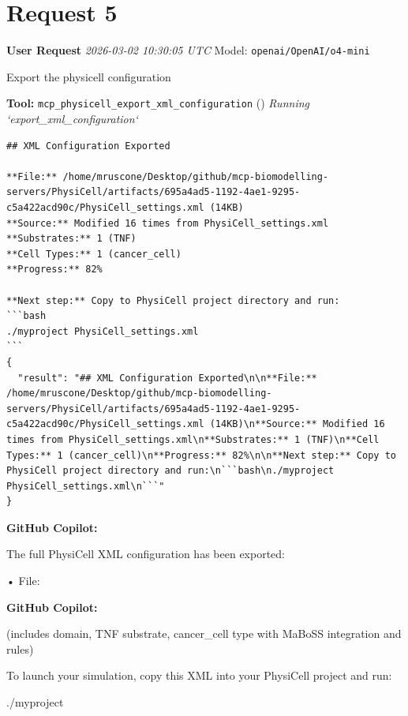 \documentclass[11pt,a4paper]{article}
\begin{document}
\section{Request 5}
\begin{userbox}
\textbf{User Request}
\quad \textit{2026-03-02 10:30:05 UTC}
\quad Model: \texttt{openai/OpenAI/o4-mini}

Export the physicell configuration

\end{userbox}
\begin{toolokbox}
\textbf{Tool:} \texttt{mcp\_physicell\_export\_xml\_configuration} (\checkmark)
\textit{Running `export\_xml\_configuration`}
\begin{lstlisting}
## XML Configuration Exported

**File:** /home/mruscone/Desktop/github/mcp-biomodelling-servers/PhysiCell/artifacts/695a4ad5-1192-4ae1-9295-c5a422acd90c/PhysiCell_settings.xml (14KB)
**Source:** Modified 16 times from PhysiCell_settings.xml
**Substrates:** 1 (TNF)
**Cell Types:** 1 (cancer_cell)
**Progress:** 82%

**Next step:** Copy to PhysiCell project directory and run:
```bash
./myproject PhysiCell_settings.xml
```
{
  "result": "## XML Configuration Exported\n\n**File:** /home/mruscone/Desktop/github/mcp-biomodelling-servers/PhysiCell/artifacts/695a4ad5-1192-4ae1-9295-c5a422acd90c/PhysiCell_settings.xml (14KB)\n**Source:** Modified 16 times from PhysiCell_settings.xml\n**Substrates:** 1 (TNF)\n**Cell Types:** 1 (cancer_cell)\n**Progress:** 82%\n\n**Next step:** Copy to PhysiCell project directory and run:\n```bash\n./myproject PhysiCell_settings.xml\n```"
}
\end{lstlisting}
\end{toolokbox}
\begin{copilotbox}
\textbf{GitHub Copilot:}

The full PhysiCell XML configuration has been exported:

• File:

\end{copilotbox}
\begin{copilotbox}
\textbf{GitHub Copilot:}

(includes domain, TNF substrate, cancer\_cell type with MaBoSS integration and rules)

To launch your simulation, copy this XML into your PhysiCell project and run:

./myproject

\end{copilotbox}
\end{document}
